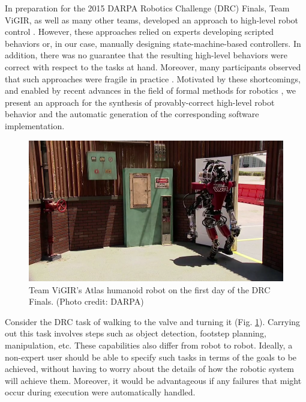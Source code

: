 
In preparation for the 2015 DARPA Robotics Challenge (DRC) Finals, Team ViGIR, as well as many other teams, developed an approach to high-level robot control \cite{Philipp2013Bsc, Philipp2015MSc}.
However, these approaches relied on experts developing scripted behaviors or, in our case, manually designing state-machine-based controllers.
In addition, there was no guarantee that the resulting high-level behaviors were correct with respect to the tasks at hand.
Moreover, many participants observed that such approaches were fragile in practice \cite{DRC-what-happened}.
Motivated by these shortcomings, and enabled by recent advances in the field of formal methods for robotics 
\cite{Vasu2013ICRA, Vasu2015TRO, JFRKG2012ICRA, Lignos2015AURO, Kavraki2015AAAI, Kavraki2015ICRA, Belta2014TAC, Fainekos2014ICRA, Dimos2014ICRA, Jon2015ICRA, Ben2015IJRR, Wolff2014ICRA, Ankur2015ISRR, Finucane2010IROS, Topcu2011RAM}, 
we present an approach for the synthesis of provably-correct high-level robot behavior and the 
automatic generation of the corresponding software implementation.

\begin{figure}[t]
\centering
\includegraphics[width=0.99\columnwidth,clip]{./img/atlas_door_finals.png}
\caption{Team ViGIR's Atlas humanoid robot on the first day of the DRC Finals. (Photo credit: DARPA)
}
\label{Fig:AtlasDoorFinals}
\vspace{-10pt}
\end{figure}

\begin{myExample}\label{Ex:PickupObject}
	Consider the DRC task of walking to the valve and turning it (Fig. \ref{Fig:AtlasDoorFinals}).
	Carrying out this task involves steps such as object detection, footstep planning, manipulation, etc.
	These capabilities also differ from robot to robot.
	Ideally, a non-expert user should be able to specify such tasks in terms of the goals to be achieved, without having to worry about the details of how the robotic system will achieve them.
	Moreover, it would be advantageous if any failures that might occur during execution were automatically handled.
\end{myExample}

